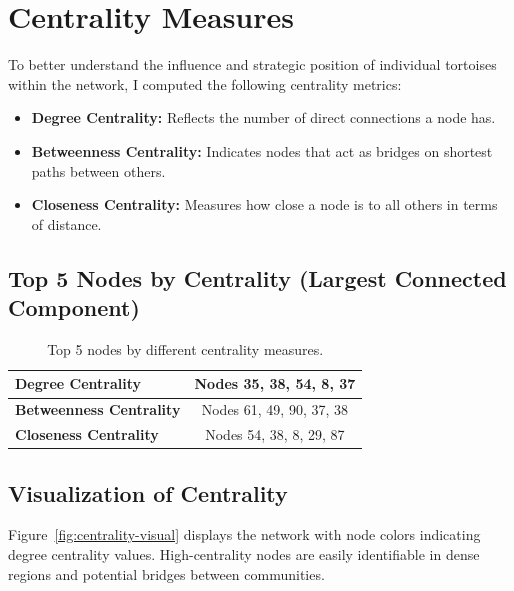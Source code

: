 \documentclass[12pt]{report}
\begin{document}
\chapter*{Centrality Measures}

To better understand the influence and strategic position of individual tortoises within the network, I computed the following centrality metrics:

\begin{itemize}
    \item \textbf{Degree Centrality:} Reflects the number of direct connections a node has.
    \item \textbf{Betweenness Centrality:} Indicates nodes that act as bridges on shortest paths between others.
    \item \textbf{Closeness Centrality:} Measures how close a node is to all others in terms of distance.
\end{itemize}

\section*{Top 5 Nodes by Centrality (Largest Connected Component)}

\begin{table}[h!]
    \centering
    \begin{tabular}{|l|c|}
        \hline
        \textbf{Degree Centrality} & Nodes 35, 38, 54, 8, 37 \\\hline
        \textbf{Betweenness Centrality} & Nodes 61, 49, 90, 37, 38 \\\hline
        \textbf{Closeness Centrality} & Nodes 54, 38, 8, 29, 87 \\\hline
    \end{tabular}
    \caption{Top 5 nodes by different centrality measures.}
    \label{tab:centrality-ranking}
\end{table}

\section*{Visualization of Centrality}

Figure~\ref{fig:centrality-visual} displays the network with node colors indicating degree centrality values. High-centrality nodes are easily identifiable in dense regions and potential bridges between communities.
\end{document}
